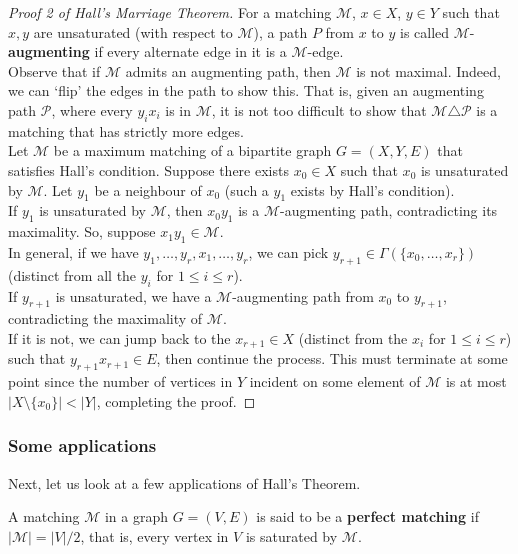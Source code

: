 			\begin{proof}[Proof 2 of Hall's Marriage Theorem]
				For a matching $\mathcal{M}$, $x\in X$, $y\in Y$ such that $x,y$ are unsaturated (with respect to $\mathcal{M}$), a path $P$ from $x$ to $y$ is called $\mathcal{M}$-\textbf{augmenting} if every alternate edge in it is a $\mathcal{M}$-edge.\\
				Observe that if $\mathcal{M}$ admits an augmenting path, then $\mathcal{M}$ is not maximal. Indeed, we can `flip' the edges in the path to show this. That is, given an augmenting path $\mathcal{P}$, where every $y_ix_i$ is in $\mathcal{M}$, it is not too difficult to show that $\mathcal{M} \triangle \mathcal{P}$ is a matching that has strictly more edges.\\

				Let $\mathcal{M}$ be a maximum matching of a bipartite graph $G=(X,Y,E)$ that satisfies Hall's condition. Suppose there exists $x_0 \in X$ such that $x_0$ is unsaturated by $\mathcal{M}$. Let $y_1$ be a neighbour of $x_0$ (such a $y_1$ exists by Hall's condition).\\
				If $y_1$ is unsaturated by $\mathcal{M}$, then $x_0y_1$ is a $\mathcal{M}$-augmenting path, contradicting its maximality. So, suppose $x_1y_1 \in \mathcal{M}$.\\
				In general, if we have $y_1,\ldots,y_r,x_1,\ldots,y_r$, we can pick $y_{r+1}\in \Gamma(\{x_0,\ldots,x_r\})$ (distinct from all the $y_i$ for $1\le i\le r$).\\
				If $y_{r+1}$ is unsaturated, we have a $\mathcal{M}$-augmenting path from $x_0$ to $y_{r+1}$, contradicting the maximality of $\mathcal{M}$.\\
				If it is not, we can jump back to the $x_{r+1}\in X$ (distinct from the $x_i$ for $1\le i\le r$) such that $y_{r+1}x_{r+1} \in E$, then continue the process. This must terminate at some point since the number of vertices in $Y$ incident on some element of $\mathcal{M}$ is at most $|X\setminus\{x_0\}|< |Y|$, completing the proof.
			\end{proof}

		\subsubsection{Some applications}

		Next, let us look at a few applications of Hall's Theorem.

		\begin{fdef}
			A matching $\mathcal{M}$ in a graph $G=(V,E)$ is said to be a \textbf{perfect matching} if $|\mathcal{M}| = |V|/2$, that is, every vertex in $V$ is saturated by $\mathcal{M}$.
		\end{fdef}

